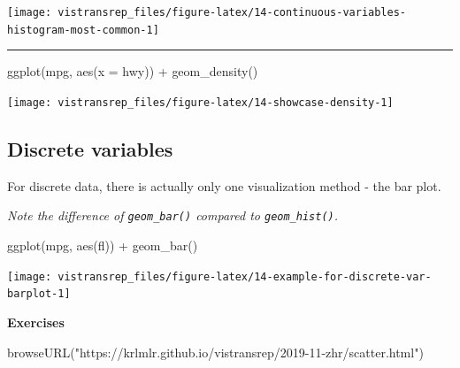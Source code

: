 \documentclass[]{book}
\newenvironment{Shaded}{}{}
\newcommand{\DataTypeTok}[1]{#1}
\newcommand{\KeywordTok}[1]{\textcolor[rgb]{0.00,0.00,1.00}{#1}}
\newcommand{\NormalTok}[1]{#1}
\newcommand{\OperatorTok}[1]{#1}
\newcommand{\StringTok}[1]{\textcolor[rgb]{0.00,0.50,0.50}{#1}}
\begin{document}
\begin{flushright}\texttt{[image: vistransrep\_files/figure-latex/14-continuous-variables-histogram-most-common-1]} \end{flushright}

\begin{center}\rule{0.5\linewidth}{\linethickness}\end{center}

\begin{Shaded}
\begin{Highlighting}[]
\KeywordTok{ggplot}\NormalTok{(mpg, }\KeywordTok{aes}\NormalTok{(}\DataTypeTok{x =}\NormalTok{ hwy)) }\OperatorTok{+}
\StringTok{  }\KeywordTok{geom_density}\NormalTok{()}
\end{Highlighting}
\end{Shaded}

\begin{flushright}\texttt{[image: vistransrep\_files/figure-latex/14-showcase-density-1]} \end{flushright}

\hypertarget{discrete-variables}{%
\subsection{Discrete variables}\label{discrete-variables}}

For discrete data, there is actually only one visualization method - the bar plot.

\smallskip

\emph{Note the difference of \texttt{geom\_bar()} compared to \texttt{geom\_hist()}.}

\begin{Shaded}
\begin{Highlighting}[]
\KeywordTok{ggplot}\NormalTok{(mpg, }\KeywordTok{aes}\NormalTok{(fl)) }\OperatorTok{+}
\StringTok{  }\KeywordTok{geom_bar}\NormalTok{()}
\end{Highlighting}
\end{Shaded}

\begin{flushright}\texttt{[image: vistransrep\_files/figure-latex/14-example-for-discrete-var-barplot-1]} \end{flushright}

\textbf{Exercises}

\begin{Shaded}
\begin{Highlighting}[]
\KeywordTok{browseURL}\NormalTok{(}\StringTok{"https://krlmlr.github.io/vistransrep/2019-11-zhr/scatter.html"}\NormalTok{)}
\end{Highlighting}
\end{Shaded}
\end{document}

